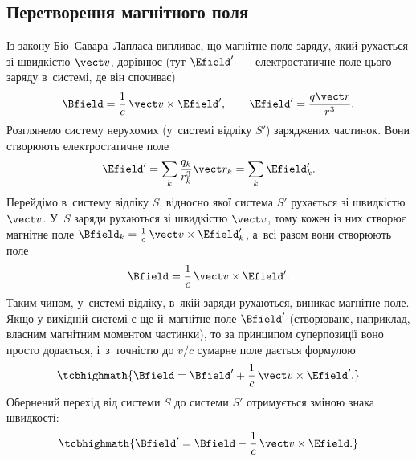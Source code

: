 \subsection*{Перетворення магнітного поля}

Із закону Біо--Савара--Лапласа випливає, що магнітне поле заряду, який рухається зі швидкістю
$\vect v$, дорівнює (тут $\Efield'$~--- електростатичне поле цього заряду в~системі, де він спочиває)
\begin{equation*}
	\Bfield = \frac1c\,\vect v\times\Efield', \qquad \Efield' = \frac{q\vect r}{r^3}.
\end{equation*}
Розглянемо систему нерухомих (у~системі відліку $S'$) заряджених частинок. Вони створюють
електростатичне поле
\begin{equation*}
	\Efield' = \sum_k \frac{q_k}{r_k^3}\vect r_k = \sum_k \Efield'_k.
\end{equation*}
Перейдімо в~систему відліку $S$, відносно якої система $S'$ рухається зі швидкістю $\vect
v$. У~$S$ заряди рухаються зі швидкістю $\vect v$, тому кожен із них створює магнітне поле
$\Bfield_k = \frac1c\,\vect v\times\Efield'_k$, а~всі разом вони створюють поле
\begin{equation*}
	\Bfield = \frac1c\,\vect v\times\Efield'.
\end{equation*}
Таким чином, у~системі відліку, в~якій заряди рухаються, виникає магнітне поле. Якщо у
вихідній системі є ще й~магнітне поле $\Bfield'$ (створюване, наприклад, власним
магнітним моментом частинки), то за принципом суперпозиції воно просто додається, і~з~точністю
до $v/c$ сумарне поле дається формулою
\begin{equation}\label{eq:BFromBprime}
	\tcbhighmath{ \Bfield = \Bfield' + \frac1c\,\vect v\times\Efield'. }
\end{equation}
Обернений перехід від системи $S$ до системи $S'$ отримується зміною знака швидкості:
\begin{equation}\label{eq:BprimeFromB}
	\tcbhighmath{ \Bfield' = \Bfield - \frac1c\,\vect v\times\Efield. }
\end{equation}

